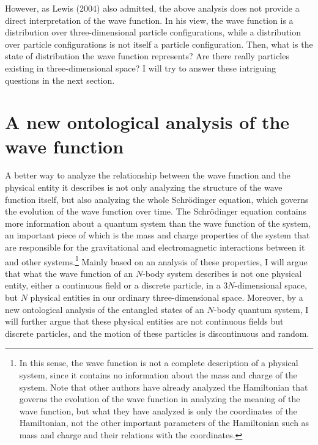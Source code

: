 However, as Lewis (2004) also admitted, the above analysis does not provide a direct interpretation of the wave function. In his view, the wave function is a distribution over three-dimensional particle configurations, while a distribution over particle configurations is not itself a particle configuration. 
Then, what is the state of distribution the wave function represents? Are there really particles existing in three-dimensional space? I will try to answer these intriguing questions in the next section.





\section{A new ontological analysis of the wave function}

A better way to analyze the relationship between the wave function and the physical entity it describes is not only analyzing the structure of the wave function itself, but also analyzing the whole Schr\"{o}dinger equation, which governs the evolution of the wave function over time. The Schr\"{o}dinger equation contains more information about a quantum system than the wave function of the system, an important piece of which is the mass and charge properties of the system that are responsible for the gravitational and electromagnetic interactions between it and other systems.\footnote{In this sense, the wave function is not a complete description of a physical system, since it contains no information about the mass and charge of the system.
Note that other authors have already analyzed the Hamiltonian that  governs the evolution of the wave function in analyzing the meaning of the wave function, but what they have analyzed is only the coordinates of the Hamiltonian, not the other important parameters of the Hamiltonian such as mass and charge and their relations with the coordinates.} %
Mainly based on an analysis of these properties, I will argue that what the wave function of an $N$-body system describes is not one physical entity, either a continuous field or a discrete particle, in a $3N$-dimensional space, but $N$ physical entities in our ordinary three-dimensional space.
Moreover, by a new ontological analysis of the entangled states of an $N$-body quantum system, I will further argue that these physical entities are not continuous fields but discrete particles, and the motion of these particles is discontinuous and random.

